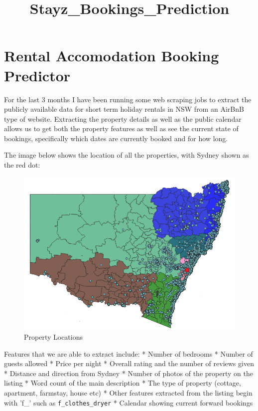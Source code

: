 \documentclass[11pt]{article}
\title{Stayz\_Bookings\_Prediction}
\makeatletter
\def\maxwidth{\ifdim\Gin@nat@width>\linewidth\linewidth
    \else\Gin@nat@width\fi}
\let\Oldincludegraphics\includegraphics
\renewcommand{\includegraphics}[1]{\Oldincludegraphics[width=.8\maxwidth]{#1}}
\makeatother
\begin{document}
    
    
    \maketitle
    
    

    
    \section{Rental Accomodation Booking
Predictor}\label{rental-accomodation-booking-predictor}

For the last 3 months I have been running some web scraping jobs to
extract the publicly available data for short term holiday rentals in
NSW from an AirBnB type of website. Extracting the property details as
well as the public calendar allows us to get both the property features
as well as see the current state of bookings, specifically which dates
are currently booked and for how long.

The image below shows the location of all the properties, with Sydney
shown as the red dot:

\begin{figure}
\centering
\includegraphics{Airbnb_Property_Locations_NSW.PNG}
\caption{Property Locations}
\end{figure}

Features that we are able to extract include: * Number of bedrooms *
Number of guests allowed * Price per night * Overall rating and the
number of reviews given * Distance and direction from Sydney * Number of
photos of the property on the listing * Word count of the main
description * The type of property (cottage, apartment, farmstay, house
etc) * Other features extracted from the listing begin with 'f\_' such
as \texttt{f\_clothes\_dryer} * Calendar showing current forward
bookings
\end{document}
